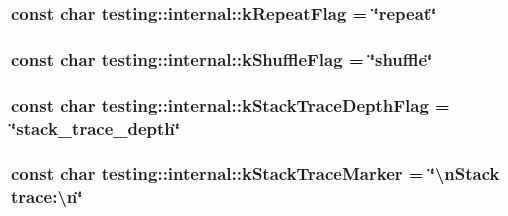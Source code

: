 \hypertarget{namespacetesting_1_1internal_a3e61db2ed34f0c3f0bc75745ea4803bf}{
\subsubsection[{k\-Repeat\-Flag}]{\setlength{\rightskip}{0pt plus 5cm}const char testing\-::internal\-::k\-Repeat\-Flag = \char`\"{}repeat\char`\"{}}}\label{namespacetesting_1_1internal_a3e61db2ed34f0c3f0bc75745ea4803bf}
\hypertarget{namespacetesting_1_1internal_adcad7638dc48dd85e3f450f111213951}{
\subsubsection[{k\-Shuffle\-Flag}]{\setlength{\rightskip}{0pt plus 5cm}const char testing\-::internal\-::k\-Shuffle\-Flag = \char`\"{}shuffle\char`\"{}}}\label{namespacetesting_1_1internal_adcad7638dc48dd85e3f450f111213951}
\hypertarget{namespacetesting_1_1internal_aa3b00898fa2231d4e19ad0b1411c6261}{
\subsubsection[{k\-Stack\-Trace\-Depth\-Flag}]{\setlength{\rightskip}{0pt plus 5cm}const char testing\-::internal\-::k\-Stack\-Trace\-Depth\-Flag = \char`\"{}stack\-\_\-trace\-\_\-depth\char`\"{}}}\label{namespacetesting_1_1internal_aa3b00898fa2231d4e19ad0b1411c6261}
\hypertarget{namespacetesting_1_1internal_abb38528ca6a45df265b19f5ccb3d16d9}{
\subsubsection[{k\-Stack\-Trace\-Marker}]{\setlength{\rightskip}{0pt plus 5cm}const char testing\-::internal\-::k\-Stack\-Trace\-Marker = \char`\"{}\textbackslash{}n\-Stack trace\-:\textbackslash{}n\char`\"{}}}\label{namespacetesting_1_1internal_abb38528ca6a45df265b19f5ccb3d16d9}

